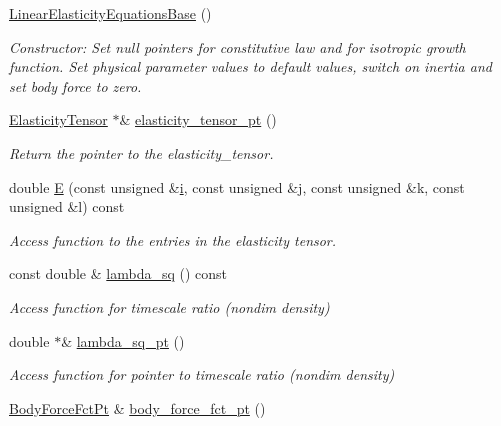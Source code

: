 \begin{DoxyCompactItemize}
\hyperlink{classoomph_1_1LinearElasticityEquationsBase_af8288b11bc988ad9ef413ea9bee5d535}{Linear\+Elasticity\+Equations\+Base} ()
\begin{DoxyCompactList}\small\item\em Constructor\+: Set null pointers for constitutive law and for isotropic growth function. Set physical parameter values to default values, switch on inertia and set body force to zero. \end{DoxyCompactList}\item 
\hyperlink{classoomph_1_1ElasticityTensor}{Elasticity\+Tensor} $\ast$\& \hyperlink{classoomph_1_1LinearElasticityEquationsBase_ac12fbacdae9347b1a570dc1a86c893c3}{elasticity\+\_\+tensor\+\_\+pt} ()
\begin{DoxyCompactList}\small\item\em Return the pointer to the elasticity\+\_\+tensor. \end{DoxyCompactList}\item 
double \hyperlink{classoomph_1_1LinearElasticityEquationsBase_ad9171d2f6ee9e0c947bdcfecbac7c1f7}{E} (const unsigned \&\hyperlink{cfortran_8h_adb50e893b86b3e55e751a42eab3cba82}{i}, const unsigned \&j, const unsigned \&k, const unsigned \&l) const
\begin{DoxyCompactList}\small\item\em Access function to the entries in the elasticity tensor. \end{DoxyCompactList}\item 
const double \& \hyperlink{classoomph_1_1LinearElasticityEquationsBase_a2a2ba588a8aee3eb327102fd3c0bbaf0}{lambda\+\_\+sq} () const
\begin{DoxyCompactList}\small\item\em Access function for timescale ratio (nondim density) \end{DoxyCompactList}\item 
double $\ast$\& \hyperlink{classoomph_1_1LinearElasticityEquationsBase_a0109438765421ac09ae6905ccc51642a}{lambda\+\_\+sq\+\_\+pt} ()
\begin{DoxyCompactList}\small\item\em Access function for pointer to timescale ratio (nondim density) \end{DoxyCompactList}\item 
\hyperlink{classoomph_1_1LinearElasticityEquationsBase_ada2fc7aa2569c35e28982f93a0749903}{Body\+Force\+Fct\+Pt} \& \hyperlink{classoomph_1_1LinearElasticityEquationsBase_abf9d9078297a4df99d48862288aecf8e}{body\+\_\+force\+\_\+fct\+\_\+pt} ()

\end{DoxyCompactItemize}
